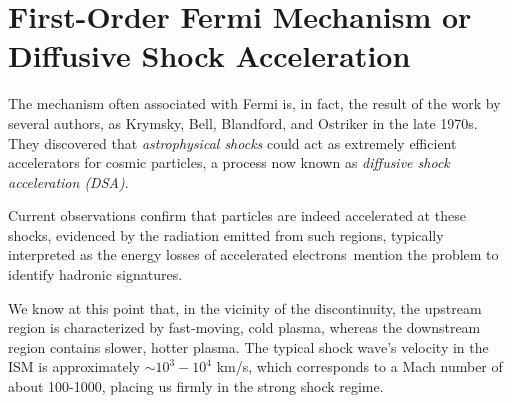 




\section{First-Order Fermi Mechanism or Diffusive Shock Acceleration}

The mechanism often associated with Fermi is, in fact, the result of the work by several authors, as Krymsky, Bell, Blandford, and Ostriker in the late 1970s. 
%
%
They discovered that \emph{astrophysical shocks} could act as extremely efficient accelerators for cosmic particles, a process now known as \emph{diffusive shock acceleration (DSA)}.

Current observations confirm that particles are indeed accelerated at these shocks, evidenced by the radiation emitted from such regions, typically interpreted as the energy losses of accelerated electrons~{\color{red}mention the problem to identify hadronic signatures}.

We know at this point that, in the vicinity of the discontinuity, the upstream region is characterized by fast-moving, cold plasma, whereas the downstream region contains slower, hotter plasma. 
%
The typical shock wave's velocity in the ISM is approximately \( \sim 10^3-10^4 \) km/s, which corresponds to a Mach number of about 100-1000, placing us firmly in the strong shock regime.

